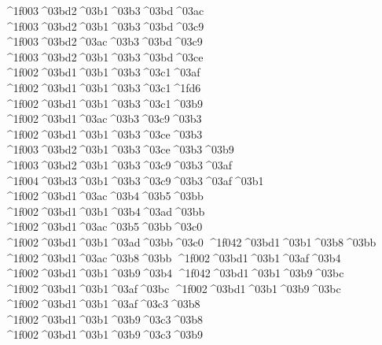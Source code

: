 {	^^^^1f003^^^^03bd2^^^^03b1^^^^03b3^^^^03bd^^^^03ac 		%
	^^^^1f003^^^^03bd2^^^^03b1^^^^03b3^^^^03bd^^^^03c9  		%
	^^^^1f003^^^^03bd2^^^^03ac^^^^03b3^^^^03bd^^^^03c9 		%
	^^^^1f003^^^^03bd2^^^^03b1^^^^03b3^^^^03bd^^^^03ce 
^^^^1f002^^^^03bd1^^^^03b1^^^^03b3^^^^03c1^^^^03af 		%
^^^^1f002^^^^03bd1^^^^03b1^^^^03b3^^^^03c1^^^^1fd6 		%
^^^^1f002^^^^03bd1^^^^03b1^^^^03b3^^^^03c1^^^^03b9   		%
^^^^1f002^^^^03bd1^^^^03ac^^^^03b3^^^^03c9^^^^03b3 		%
^^^^1f002^^^^03bd1^^^^03b1^^^^03b3^^^^03ce^^^^03b3
	^^^^1f003^^^^03bd2^^^^03b1^^^^03b3^^^^03ce^^^^03b3^^^^03b9   		%
	^^^^1f003^^^^03bd2^^^^03b1^^^^03b3^^^^03c9^^^^03b3^^^^03af
		^^^^1f004^^^^03bd3^^^^03b1^^^^03b3^^^^03c9^^^^03b3^^^^03af^^^^03b1 		%
^^^^1f002^^^^03bd1^^^^03ac^^^^03b4^^^^03b5^^^^03bb 		%
^^^^1f002^^^^03bd1^^^^03b1^^^^03b4^^^^03ad^^^^03bb
^^^^1f002^^^^03bd1^^^^03ac^^^^03b5^^^^03bb^^^^03c0  		%
^^^^1f002^^^^03bd1^^^^03b1^^^^03ad^^^^03bb^^^^03c0
^^^^1f042^^^^03bd1^^^^03b1^^^^03b8^^^^03bb  		%
^^^^1f002^^^^03bd1^^^^03ac^^^^03b8^^^^03bb
^^^^1f002^^^^03bd1^^^^03b1^^^^03af^^^^03b4  		%
^^^^1f002^^^^03bd1^^^^03b1^^^^03b9^^^^03b4   		%
^^^^1f042^^^^03bd1^^^^03b1^^^^03b9^^^^03bc  		%
^^^^1f002^^^^03bd1^^^^03b1^^^^03af^^^^03bc
^^^^1f002^^^^03bd1^^^^03b1^^^^03b9^^^^03bc   		%
^^^^1f002^^^^03bd1^^^^03b1^^^^03af^^^^03c3^^^^03b8 		%
^^^^1f002^^^^03bd1^^^^03b1^^^^03b9^^^^03c3^^^^03b8
^^^^1f002^^^^03bd1^^^^03b1^^^^03b9^^^^03c3^^^^03b9  		%
}

